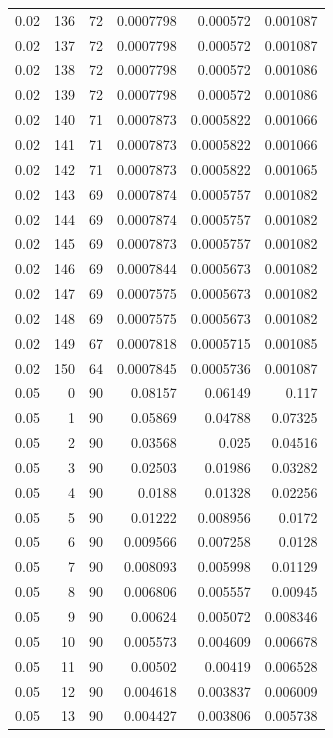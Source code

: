 \begin{tabular}{rrrrrr}
0.02 & 136 & 72 & 0.0007798 & 0.000572 & 0.001087 \\
0.02 & 137 & 72 & 0.0007798 & 0.000572 & 0.001087 \\
0.02 & 138 & 72 & 0.0007798 & 0.000572 & 0.001086 \\
0.02 & 139 & 72 & 0.0007798 & 0.000572 & 0.001086 \\
0.02 & 140 & 71 & 0.0007873 & 0.0005822 & 0.001066 \\
0.02 & 141 & 71 & 0.0007873 & 0.0005822 & 0.001066 \\
0.02 & 142 & 71 & 0.0007873 & 0.0005822 & 0.001065 \\
0.02 & 143 & 69 & 0.0007874 & 0.0005757 & 0.001082 \\
0.02 & 144 & 69 & 0.0007874 & 0.0005757 & 0.001082 \\
0.02 & 145 & 69 & 0.0007873 & 0.0005757 & 0.001082 \\
0.02 & 146 & 69 & 0.0007844 & 0.0005673 & 0.001082 \\
0.02 & 147 & 69 & 0.0007575 & 0.0005673 & 0.001082 \\
0.02 & 148 & 69 & 0.0007575 & 0.0005673 & 0.001082 \\
0.02 & 149 & 67 & 0.0007818 & 0.0005715 & 0.001085 \\
0.02 & 150 & 64 & 0.0007845 & 0.0005736 & 0.001087 \\
0.05 & 0 & 90 & 0.08157 & 0.06149 & 0.117 \\
0.05 & 1 & 90 & 0.05869 & 0.04788 & 0.07325 \\
0.05 & 2 & 90 & 0.03568 & 0.025 & 0.04516 \\
0.05 & 3 & 90 & 0.02503 & 0.01986 & 0.03282 \\
0.05 & 4 & 90 & 0.0188 & 0.01328 & 0.02256 \\
0.05 & 5 & 90 & 0.01222 & 0.008956 & 0.0172 \\
0.05 & 6 & 90 & 0.009566 & 0.007258 & 0.0128 \\
0.05 & 7 & 90 & 0.008093 & 0.005998 & 0.01129 \\
0.05 & 8 & 90 & 0.006806 & 0.005557 & 0.00945 \\
0.05 & 9 & 90 & 0.00624 & 0.005072 & 0.008346 \\
0.05 & 10 & 90 & 0.005573 & 0.004609 & 0.006678 \\
0.05 & 11 & 90 & 0.00502 & 0.00419 & 0.006528 \\
0.05 & 12 & 90 & 0.004618 & 0.003837 & 0.006009 \\
0.05 & 13 & 90 & 0.004427 & 0.003806 & 0.005738 \\

\end{tabular}
